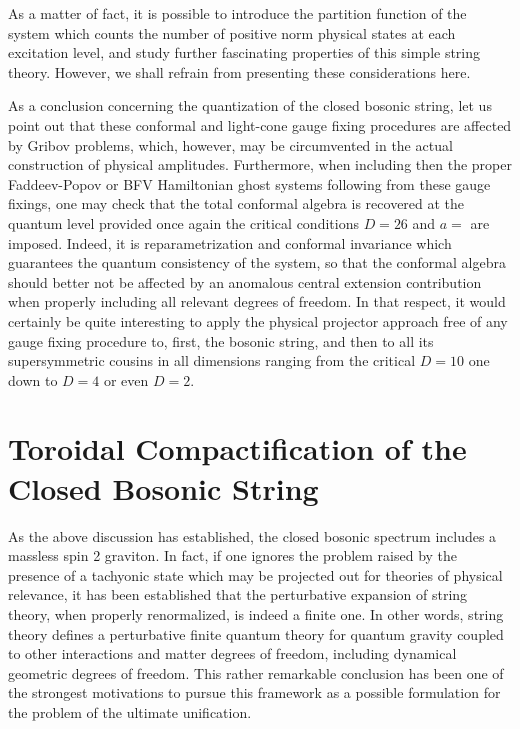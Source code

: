 \documentclass[a4paper,11pt]{article}
\begin{document}
As a matter of fact, it is possible to introduce the partition function
of the system which counts the number of positive norm physical states
at each excitation level, and study further fascinating properties
of this simple string theory. However, we shall refrain from presenting
these considerations here.

As a conclusion concerning the quantization of the closed bosonic string,
let us point out that these conformal and light-cone gauge fixing
procedures are affected by Gribov problems,\cite{JG10,JG11} which, however, 
may be circumvented in the actual construction of physical amplitudes. 
Furthermore, when including then the proper Faddeev-Popov or BFV Hamiltonian 
ghost systems following from these gauge fixings, one may check that the
total conformal algebra is recovered at the quantum level
provided once again the critical conditions $D=26$ and $a=$ are 
imposed.\cite{Pol,GSW,JG10} Indeed,
it is reparametrization and conformal invariance which guarantees the
quantum consistency of the system, so that the conformal algebra should
better not be affected by an anomalous central extension contribution
when properly including all relevant degrees of freedom. In that respect,
it would certainly be quite interesting to apply the physical projector
approach free of any gauge fixing procedure to, first, the bosonic string,
and then to all its supersymmetric cousins in all dimensions ranging
from the critical $D=10$ one down to $D=4$ or even $D=2$.


\section{Toroidal Compactification of the Closed Bosonic String}
\label{Sect8}

As the above discussion has established, the closed bosonic spectrum
includes a massless spin 2 graviton. In fact, if one ignores the problem
raised by the presence of a tachyonic state which may be projected out for
theories of physical relevance, it has been established\cite{Pol,GSW} that 
the perturbative expansion of string theory, when properly renormalized, is 
indeed a finite one. In other words, string theory defines a perturbative 
finite quantum theory for quantum gravity coupled to other interactions and 
matter degrees of freedom, including dynamical geometric degrees of freedom. 
This rather remarkable conclusion has been one of the strongest motivations 
to pursue this framework as a possible formulation for the problem of the 
ultimate unification.
\end{document}
